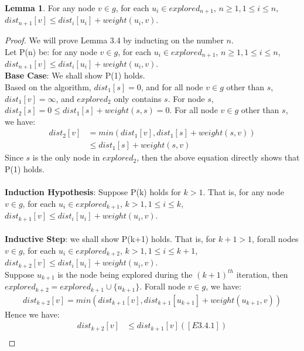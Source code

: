 \documentclass[11pt, oneside]{article}   	%
\theoremstyle{definition}
\newtheorem{sublemma}{Lemma}[section]
\begin{document}
\begin{sublemma}
For any node $v \in g$, for each $u_i \in explored_{n+1}$, $n \geq 1, 1 \leq i \leq n$, $dist_{n+1}[v] \leq dist_i[u_i] + weight(u_i, v)$. 
\end{sublemma}
\begin{proof}
We will prove Lemma 3.4 by inducting on the number $n$. 
\\
Let P(n) be: for any node $v \in g$, for each $u_i \in explored_{n+1}$, $n \geq 1, 1 \leq i \leq n$, $dist_{n+1}[v] \leq dist_i[u_i] + weight(u_i, v)$. 
\\
\textbf{Base Case}: We shall show P(1) holds. 
\\
Based on the algorithm, $dist_1[s] = 0$, and for all node $v \in g$ other than $s$, $dist_1[v] = \infty$, and $explored_2$ only contains $s$. For node $s$, $dist_2[s] = 0 \leq dist_1[s] + weight(s, s) = 0$. For all node $v \in g$ other than $s$, we have: 
\begin{align*}
      dist_2[v] &= min(dist_1[v], dist_1[s] + weight(s, v)) \\
                &\leq dist_1[s] + weight(s, v)
\end{align*}
Since $s$ is the only node in $explored_2$, then the above equation directly shows that P(1) holds. 
\\\\
\textbf{Induction Hypothesis}: Suppose P(k) holds for $k > 1$. That is, for any node $v \in g$, for each $u_i \in explored_{k+1}$, $k > 1, 1 \leq i \leq k$, $dist_{k+1}[v] \leq dist_i[u_i] + weight(u_i, v)$. 
\\\\
\textbf{Inductive Step}: we shall show P(k+1) holds. That is,  for $k+1 > 1$, forall nodes $v \in g$,  for each $u_i \in explored_{k+2}$, $k > 1, 1 \leq i \leq k+1$, $dist_{k+2}[v] \leq dist_i[u_i] + weight(u_i, v)$. 
\\
Suppose $u_{k+1}$ is the node being explored during the $(k+1)^{th}$ iteration, then $explored_{k+2} = explored_{k+1} \cup \{u_{k+1}\}$. Forall node $v \in g$, we have: 
\begin{align*}
  dist_{k+2}[v] = min(dist_{k+1}[v], dist_{k+1}[u_{k+1}] + weight(u_{k+1}, v))
\end{align*}
Hence we have: 
\begin{align*}
  dist_{k+2}[v] &\leq dist_{k+1}[v] ([E3.4.1])\\

\end{align*}
\end{proof}
\end{document}

